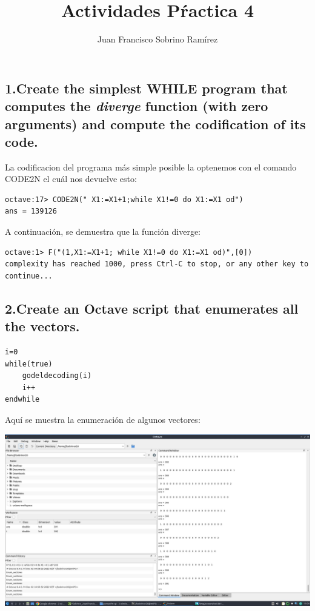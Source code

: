 \documentclass[20pt,oneside]{extbook}
\title{\Huge {Actividades Pŕactica 4}}
\author{Juan Francisco Sobrino Ramírez}
\date{}
\begin{document}
\maketitle

\newpage 

\subsection*{
1.Create the simplest WHILE program that computes the \textit{diverge} function (with zero arguments) and compute the codification of its code.
}
La codificacion del programa más simple posible la optenemos con el comando CODE2N el cuál nos devuelve esto:\\
\begin{verbatim}
octave:17> CODE2N(" X1:=X1+1;while X1!=0 do X1:=X1 od")
ans = 139126
\end{verbatim}

A continuación, se demuestra que la función diverge:
\begin{verbatim}
octave:1> F("(1,X1:=X1+1; while X1!=0 do X1:=X1 od)",[0])
complexity has reached 1000, press Ctrl-C to stop, or any other key to continue...
\end{verbatim}

\newpage
\subsection*{
2.Create an Octave script that enumerates all the vectors.
}
\begin{verbatim}
i=0
while(true)
    godeldecoding(i)
    i++
endwhile
\end{verbatim}

Aquí se muestra la enumeración de algunos vectores:

\includegraphics[scale=0.5]{EnumVectores.jpg}
\end{document}

